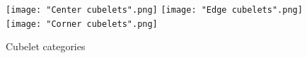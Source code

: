 \documentclass[final, letterpaper, 10 pt, conference, onecolumn]{IEEEtran}
\begin{document}
\begin{figure}[!htb]
  \texttt{[image: "Center cubelets".png]}
  \label{fig:center_cubelets}
\endminipage\hfill
{}
  \texttt{[image: "Edge cubelets".png]}
  \label{fig:edge_cubelets}
\endminipage\hfill
{}%
  \texttt{[image: "Corner cubelets".png]}
  \label{fig:corner_cubelets}
\endminipage
\caption{Cubelet categories}
\label{fig:cubelet_categories}
\end{figure}
\end{document}
